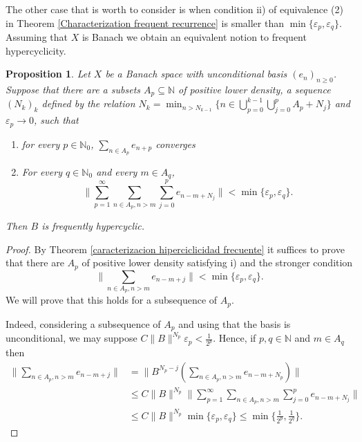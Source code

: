 \documentclass[11pt]{amsart}
\newtheorem{proposition}[theorem]{Proposition}
\newcommand{\zN}{\mathbb N}
\begin{document}
The other case that is worth to consider is when
condition ii) of equivalence (2) in Theorem \ref{Characterization frequent recurrence} is smaller than $\min\{\varepsilon_p,\varepsilon_q\}$. Assuming that $X$ is Banach we obtain an equivalent notion to frequent hypercyclicity.

\begin{proposition}\label{prop: condicion con el min}
    Let $X$ be a Banach space with unconditional basis $(e_n)_{n\ge 0}$. Suppose that there are a subsets $A_p\subseteq \zN$ of positive lower density, a sequence $(N_k)_k$ defined by the relation $N_k=\min_{n>N_{k-1}} \{n\in \bigcup_{p=0}^{k-1}\bigcup_{j=0}^p A_p+N_j\}$ and $\varepsilon_p\to 0$, such that
\begin{enumerate}
    \item [i)]for every $p\in\mathbb N_0$, $\sum_{n\in A_p}e_{n+p}$ converges 
    \item [ii)]
    For every $q\in\mathbb N_0$ and every  $m\in A_q$,
    $$\|\sum_{p=1}^\infty \sum_{n\in A_p, n>m} \sum_{j=0}^p e_{n-m+N_j}\|<\min\{\varepsilon_p,\varepsilon_q\}.$$
   \end{enumerate}
   Then $B$ is frequently hypercyclic.
\end{proposition}
\begin{proof}
By Theorem \ref{caracterizacion hiperciclicidad frecuente} it suffices to prove that there are $A_p$ of positive lower density satisfying i) and the stronger condition
$$\|\sum_{n\in A_p,n>m} e_{n-m+j}\|<\min\{\varepsilon_p,\varepsilon_q\}.$$
We will prove that this holds for a subsequence of $A_p$.

Indeed, considering a subsequence of $A_p$ and using that the basis is unconditional, we may suppose $C\|B\|^{N_p}\varepsilon_p<\frac{1}{2^p}$. Hence, if $p,q\in\zN$ and $m\in A_q$ then
\begin{align*}
  \|\sum_{n\in A_p, n>m} e_{n-m+j}\|&=\|B^{N_p-j}\left(\sum_{n\in A_{p},n>m} e_{n-m+N_p}\right)\|\\
  &\leq C\|B\|^{N_p}\|\sum_{p=1}^\infty \sum_{n\in A_p,n>m}\sum_{j=0}^p e_{n-m+N_j}\|\\
  &\leq C\|B\|^{N_p}\min\{\varepsilon_p,\varepsilon_q\}\leq \min \{\frac{1}{2^p},\frac{1}{2^q}\}.
\end{align*}
\end{proof}
\end{document}
